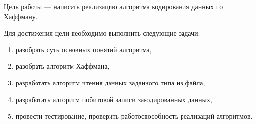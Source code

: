 Цель работы --- написать реализацию алгоритма кодирования данных по Хаффману.

Для достижения цели необходимо выполнить следующие задачи:
\begin{enumerate}
\item разобрать суть основных понятий алгоритма,
\item разобрать алгоритм Хаффмана,
\item разработать алгоритм чтения данных заданного типа из файла,
\item разработать алгоритм побитовой записи закодированных данных,
\item провести тестирование, проверить работоспособность реализаций алгоритмов.
\end{enumerate}
\clearpage
